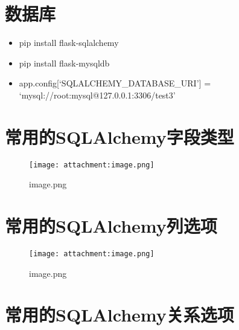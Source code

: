 \documentclass[11pt]{article}
\makeatletter
\def\maxwidth{\ifdim\Gin@nat@width>\linewidth\linewidth
    \else\Gin@nat@width\fi}
\let\Oldincludegraphics\includegraphics
\renewcommand{\includegraphics}[1]{\Oldincludegraphics[width=.8\maxwidth]{#1}}
\providecommand{\tightlist}{%
      \setlength{\itemsep}{0pt}\setlength{\parskip}{0pt}}
\newenvironment{Shaded}{}{}
\newcommand{\NormalTok}[1]{{#1}}
\makeatother
\begin{document}
\begin{Shaded}
\end{Shaded}

    \hypertarget{ux6570ux636eux5e93}{%
\section{数据库}\label{ux6570ux636eux5e93}}

\begin{itemize}
\tightlist
\item
  pip install flask-sqlalchemy
\item
  pip install flask-mysqldb
\item
  app.config{[}`SQLALCHEMY\_DATABASE\_URI'{]} =
  `mysql://root:mysql@127.0.0.1:3306/test3'
\end{itemize}

    \hypertarget{ux5e38ux7528ux7684sqlalchemyux5b57ux6bb5ux7c7bux578b}{%
\section{常用的SQLAlchemy字段类型}\label{ux5e38ux7528ux7684sqlalchemyux5b57ux6bb5ux7c7bux578b}}

\begin{figure}
\centering
\texttt{[image: attachment:image.png]}
\caption{image.png}
\end{figure}

    \hypertarget{ux5e38ux7528ux7684sqlalchemyux5217ux9009ux9879}{%
\section{常用的SQLAlchemy列选项}\label{ux5e38ux7528ux7684sqlalchemyux5217ux9009ux9879}}

\begin{figure}
\centering
\texttt{[image: attachment:image.png]}
\caption{image.png}
\end{figure}

    \hypertarget{ux5e38ux7528ux7684sqlalchemyux5173ux7cfbux9009ux9879}{%
\section{常用的SQLAlchemy关系选项}\label{ux5e38ux7528ux7684sqlalchemyux5173ux7cfbux9009ux9879}}
\end{document}
